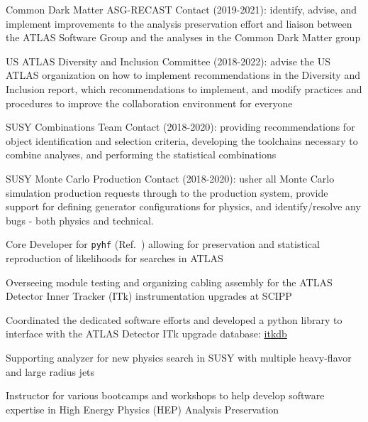 \documentclass[margin,line]{resume}
\begin{document}
\begin{resume}
\begin{list2}
  \item Common Dark Matter ASG-RECAST Contact (2019-2021): identify, advise, and implement improvements to the analysis preservation effort and liaison between the ATLAS Software Group and the analyses in the Common Dark Matter group
  \item US ATLAS Diversity and Inclusion Committee (2018-2022): advise the US ATLAS organization on how to implement recommendations in the Diversity and Inclusion report, which recommendations to implement, and modify practices and procedures to improve the collaboration environment for everyone
  \item SUSY Combinations Team Contact (2018-2020): providing recommendations for object identification and selection criteria, developing the toolchains necessary to combine analyses, and performing the statistical combinations
  \item SUSY Monte Carlo Production Contact (2018-2020): usher all Monte Carlo simulation production requests through to the production system, provide support for defining generator configurations for physics, and identify/resolve any bugs - both physics and technical.
  \item Core Developer for \texttt{pyhf} (Ref.~\cite{ATL-PHYS-PUB-2019-029}) allowing for preservation and statistical reproduction of likelihoods for searches in ATLAS
  \item Overseeing module testing and organizing cabling assembly for the ATLAS Detector Inner Tracker (ITk) instrumentation upgrades at SCIPP
  \item Coordinated the dedicated software efforts and developed a python library to interface with the ATLAS Detector ITk upgrade database: \href{https://pypi.org/project/itkdb/}{itkdb}
  \item Supporting analyzer for new physics search in SUSY with multiple heavy-flavor and large radius jets \cite{SUSY-2016-10, SUSY-2015-10, ATLAS-CONF-2017-021, ATLAS-CONF-2016-052, ATLAS-CONF-2015-067}
  \item Instructor for various bootcamps and workshops to help develop software expertise in High Energy Physics (HEP) Analysis Preservation~\cite{AwesomeFeb2020,USATLASBootcamp2019}
\end{list2}

\newpage



\end{resume}
\end{document}
